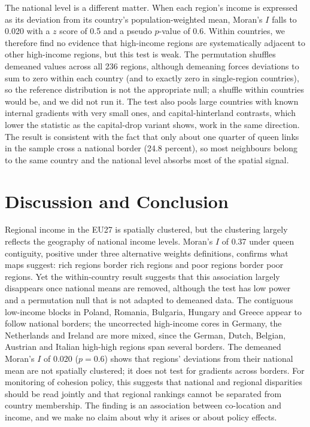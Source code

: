 \documentclass[11pt]{article}
\begin{document}
The national level is a different matter. When each region's income is expressed as its deviation from its country's population-weighted mean, Moran's $I$ falls to 0.020 with a $z$ score of 0.5 and a pseudo $p$-value of 0.6.
Within countries, we therefore find no evidence that high-income regions are systematically adjacent to other high-income regions, but this test is weak. The permutation shuffles demeaned values across all 236 regions, although demeaning forces deviations to sum to zero within each country (and to exactly zero in single-region countries), so the reference distribution is not the appropriate null; a shuffle within countries would be, and we did not run it. The test also pools large countries with known internal gradients with very small ones, and capital-hinterland contrasts, which lower the statistic as the capital-drop variant shows, work in the same direction. The result is consistent with the fact that only about one quarter of queen links in the sample cross a national border (24.8 percent), so most neighbours belong to the same country and the national level absorbs most of the spatial signal.



\section{Discussion and Conclusion}

Regional income in the EU27 is spatially clustered, but the clustering largely reflects the geography of national income levels. Moran's $I$ of 0.37 under queen contiguity, positive under three alternative weights definitions, confirms what maps suggest: rich regions border rich regions and poor regions border poor regions. Yet the within-country result suggests that this association largely disappears once national means are removed, although the test has low power and a permutation null that is not adapted to demeaned data. The contiguous low-income blocks in Poland, Romania, Bulgaria, Hungary and Greece appear to follow national borders; the uncorrected high-income cores in Germany, the Netherlands and Ireland are more mixed, since the German, Dutch, Belgian, Austrian and Italian high-high regions span several borders. The demeaned Moran's $I$ of 0.020 ($p=0.6$) shows that regions' deviations from their national mean are not spatially clustered; it does not test for gradients across borders. For monitoring of cohesion policy, this suggests that national and regional disparities should be read jointly and that regional rankings cannot be separated from country membership. The finding is an association between co-location and income, and we make no claim about why it arises or about policy effects.
\end{document}
